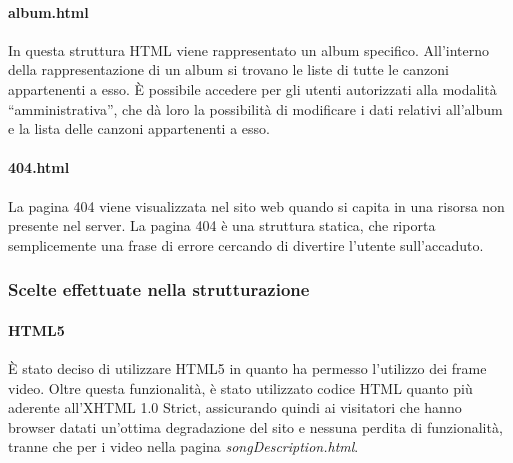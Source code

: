 \paragraph*{album.html} In questa struttura HTML viene rappresentato un album specifico. All'interno della rappresentazione di un album si trovano le liste di tutte le canzoni appartenenti a esso. È possibile accedere per gli utenti autorizzati alla modalità ``amministrativa'', che d\`a loro la possibilità di modificare i dati relativi all'album e la lista delle canzoni appartenenti a esso. %

\paragraph*{404.html} La pagina 404 viene visualizzata nel sito web quando si capita in una risorsa non presente nel server. La pagina 404 è una struttura statica, che riporta semplicemente una frase di errore cercando di divertire l'utente sull'accaduto.

\subsubsection{Scelte effettuate nella strutturazione}

\paragraph{HTML5}
È stato deciso di utilizzare HTML5 in quanto ha permesso l'utilizzo dei frame video. Oltre questa funzionalità, è stato utilizzato codice HTML quanto più aderente all'XHTML 1.0 Strict, assicurando quindi ai visitatori che hanno browser datati un'ottima degradazione del sito e nessuna perdita di funzionalità, tranne che per i video nella pagina \textit{songDescription.html}.
